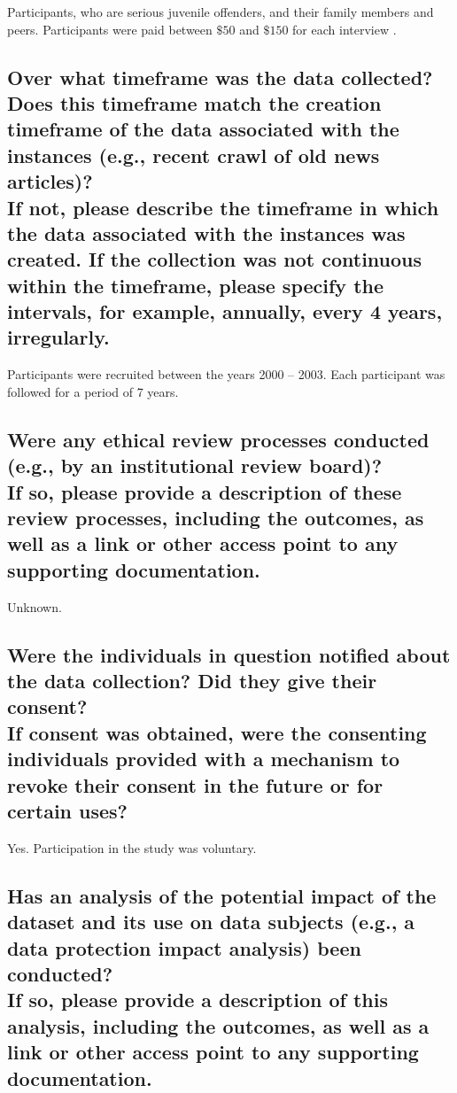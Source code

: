 \documentclass[letterpaper, 10 pt, conference]{ieeeconf}  %
\newcommand{\subtitle}[1]{{\\ \small \normalfont \color{purple} #1}}
\begin{document}
Participants, who are serious juvenile offenders, and their family members and peers. Participants were paid between $\$50$ and $\$150$ for each interview \cite{pathways_report}.

\subsection{Over what timeframe was the data collected? Does this timeframe match the creation timeframe of the data associated with the instances (e.g., recent crawl of old news articles)? \subtitle{If not, please describe the timeframe in which the data associated with the instances was created. If the collection was not continuous within the timeframe, please specify the intervals, for example, annually, every 4 years, irregularly.}}

Participants were recruited between the years 2000 -- 2003. Each participant was followed for a period of 7 years. 

\subsection{Were any ethical review processes conducted (e.g., by an institutional review board)? \subtitle{If so, please provide a description of these review processes, including the outcomes, as well as a link or other access point to any supporting documentation.}}

Unknown. 

\subsection{Were the individuals in question notified about the data collection? Did they give their consent? \subtitle{If consent was obtained, were the consenting individuals provided with a mechanism to revoke their consent in the future or for certain uses?}}

Yes. Participation in the study was voluntary. 

\subsection{Has an analysis of the potential impact of the dataset and its use on data subjects (e.g., a data protection impact analysis) been conducted? \subtitle{If so, please provide a description of this analysis, including the outcomes, as well as a link or other access point to any supporting documentation.}}
\end{document}

